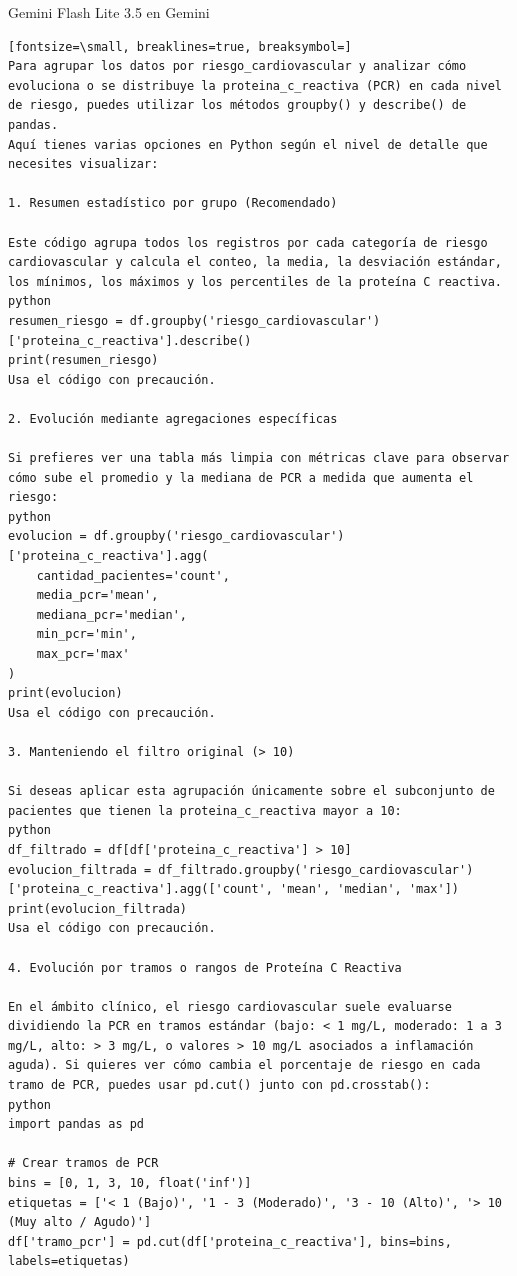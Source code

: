 \documentclass[12pt,a4paper,oneside]{book}
\begin{document}
\begin{iaresp}{Gemini Flash Lite 3.5 en Gemini}
\begin{Verbatim}[fontsize=\small, breaklines=true, breaksymbol=]
Para agrupar los datos por riesgo_cardiovascular y analizar cómo evoluciona o se distribuye la proteina_c_reactiva (PCR) en cada nivel de riesgo, puedes utilizar los métodos groupby() y describe() de pandas.
Aquí tienes varias opciones en Python según el nivel de detalle que necesites visualizar:

1. Resumen estadístico por grupo (Recomendado)

Este código agrupa todos los registros por cada categoría de riesgo cardiovascular y calcula el conteo, la media, la desviación estándar, los mínimos, los máximos y los percentiles de la proteína C reactiva.
python
resumen_riesgo = df.groupby('riesgo_cardiovascular')['proteina_c_reactiva'].describe()
print(resumen_riesgo)
Usa el código con precaución.

2. Evolución mediante agregaciones específicas

Si prefieres ver una tabla más limpia con métricas clave para observar cómo sube el promedio y la mediana de PCR a medida que aumenta el riesgo:
python
evolucion = df.groupby('riesgo_cardiovascular')['proteina_c_reactiva'].agg(
    cantidad_pacientes='count',
    media_pcr='mean',
    mediana_pcr='median',
    min_pcr='min',
    max_pcr='max'
)
print(evolucion)
Usa el código con precaución.

3. Manteniendo el filtro original (> 10)

Si deseas aplicar esta agrupación únicamente sobre el subconjunto de pacientes que tienen la proteina_c_reactiva mayor a 10:
python
df_filtrado = df[df['proteina_c_reactiva'] > 10]
evolucion_filtrada = df_filtrado.groupby('riesgo_cardiovascular')['proteina_c_reactiva'].agg(['count', 'mean', 'median', 'max'])
print(evolucion_filtrada)
Usa el código con precaución.

4. Evolución por tramos o rangos de Proteína C Reactiva

En el ámbito clínico, el riesgo cardiovascular suele evaluarse dividiendo la PCR en tramos estándar (bajo: < 1 mg/L, moderado: 1 a 3 mg/L, alto: > 3 mg/L, o valores > 10 mg/L asociados a inflamación aguda). Si quieres ver cómo cambia el porcentaje de riesgo en cada tramo de PCR, puedes usar pd.cut() junto con pd.crosstab():
python
import pandas as pd

# Crear tramos de PCR
bins = [0, 1, 3, 10, float('inf')]
etiquetas = ['< 1 (Bajo)', '1 - 3 (Moderado)', '3 - 10 (Alto)', '> 10 (Muy alto / Agudo)']
df['tramo_pcr'] = pd.cut(df['proteina_c_reactiva'], bins=bins, labels=etiquetas)


\end{Verbatim}
\end{iaresp}
\end{document}
